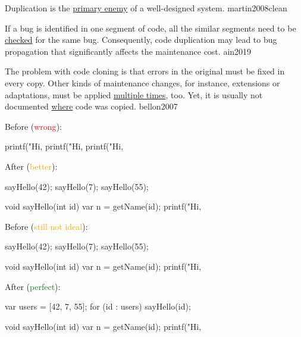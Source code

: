 \documentclass{article}
\begin{document}


  {Duplication is the \ul{primary enemy} of a well-designed system.}
  {martin2008clean}

  {If a bug is identified in one segment of code, all the similar segments need to be \ul{checked} for the same bug. Consequently, code duplication may lead to bug propagation that significantly affects the maintenance cost.}
  {ain2019}

  {The problem with code cloning is that errors in the original must be fixed in every copy. Other kinds of maintenance changes, for instance, extensions or adaptations, must be applied \ul{multiple times}, too. Yet, it is usually not documented \ul{where} code was copied.}
  {bellon2007}

\begin{multicols}{2}
Before (\textcolor{red}{wrong}):\par
{\small\begin{ffcode}
printf("Hi, %
printf("Hi, %
printf("Hi, %
\end{ffcode}
}
\par\columnbreak\par
After (\textcolor{orange}{better}):\par
{\small\begin{ffcode}
sayHello(42);
sayHello(7);
sayHello(55);

void sayHello(int id) {
  var n = getName(id);
  printf("Hi, %
}
\end{ffcode}
}
\end{multicols}
\plush{}

\begin{multicols}{2}
Before (\textcolor{orange}{still not ideal}):\par
{\small\begin{ffcode}
sayHello(42);
sayHello(7);
sayHello(55);

void sayHello(int id) {
  var n = getName(id);
  printf("Hi, %
}
\end{ffcode}
}
\par\columnbreak\par
After (\textcolor{green}{perfect}):\par
{\small\begin{ffcode}
var users = [42, 7, 55];
for (id : users) {
  sayHello(id);
}

void sayHello(int id) {
  var n = getName(id);
  printf("Hi, %
}
\end{ffcode}
}
\end{multicols}
\plush{}
\end{document}
